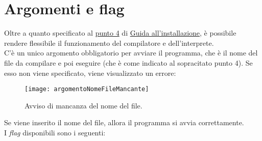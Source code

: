 \documentclass[../report.tex]{subfiles}
\begin{document}
\section{Argomenti e flag}\label{s:argomenti-flag}
Oltre a quanto specificato al \hyperref[a:pt4]{punto 4} di \hyperref[a:installazione]{Guida all'installazione}, è possibile rendere flessibile il funzionamento del compilatore e dell'interprete.\\
C'è un unico argomento obbligatorio per avviare il programma, che è il nome del file da compilare e poi eseguire (che è come indicato al sopracitato punto 4). Se esso non viene specificato, viene visualizzato un errore:
\begin{figure}[H]
    \centering
    \texttt{[image: argomentoNomeFileMancante]}
    \caption{Avviso di mancanza del nome del file.}
    \label{fig:argomento-nome-file-mancante}
\end{figure}
\noindent
Se viene inserito il nome del file, allora il programma si avvia correttamente.\\
I \textit{flag} disponibili sono i seguenti:
\end{document}
